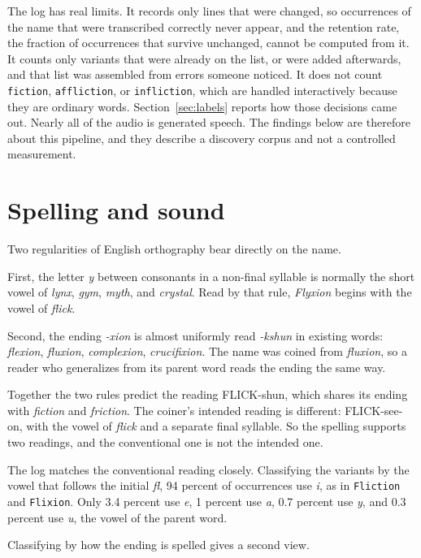 \documentclass[11pt]{article}
\begin{document}
The log has real limits. It records only lines that were changed, so occurrences of the name that were transcribed correctly never appear, and the retention rate, the fraction of occurrences that survive unchanged, cannot be computed from it. It counts only variants that were already on the list, or were added afterwards, and that list was assembled from errors someone noticed. It does not count \texttt{fiction}, \texttt{affliction}, or \texttt{infliction}, which are handled interactively because they are ordinary words. Section~\ref{sec:labels} reports how those decisions came out. Nearly all of the audio is generated speech. The findings below are therefore about this pipeline, and they describe a discovery corpus and not a controlled measurement.

\section{Spelling and sound}

Two regularities of English orthography bear directly on the name.

First, the letter \emph{y} between consonants in a non-final syllable is normally the short vowel of \emph{lynx}, \emph{gym}, \emph{myth}, and \emph{crystal}. Read by that rule, \emph{Flyxion} begins with the vowel of \emph{flick}.

Second, the ending \emph{-xion} is almost uniformly read \emph{-kshun} in existing words: \emph{flexion}, \emph{fluxion}, \emph{complexion}, \emph{crucifixion}. The name was coined from \emph{fluxion}, so a reader who generalizes from its parent word reads the ending the same way.

Together the two rules predict the reading FLICK-shun, which shares its ending with \emph{fiction} and \emph{friction}. The coiner's intended reading is different: FLICK-see-on, with the vowel of \emph{flick} and a separate final syllable. So the spelling supports two readings, and the conventional one is not the intended one.

The log matches the conventional reading closely. Classifying the variants by the vowel that follows the initial \emph{fl}, 94 percent of occurrences use \emph{i}, as in \texttt{Fliction} and \texttt{Flixion}. Only 3.4 percent use \emph{e}, 1 percent use \emph{a}, 0.7 percent use \emph{y}, and 0.3 percent use \emph{u}, the vowel of the parent word.

Classifying by how the ending is spelled gives a second view.
\end{document}

